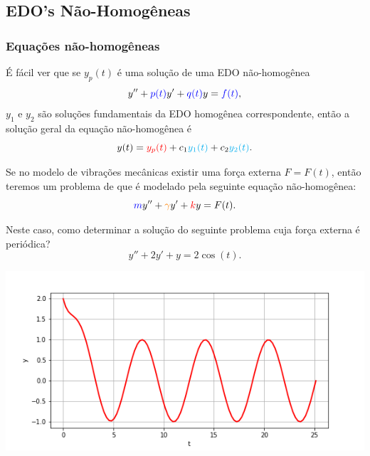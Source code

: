 %

\subsection*{EDO's Não-Homogêneas}



\begin{frame}
\frametitle{Equações não-homogêneas }

É fácil ver que se {\color{red}$y_p(t)$} é uma solução de uma EDO não-homogênea
\[y''+{\color{blue}p(t)}y'+{\color{blue}q(t)}y={\color{blue}f(t)},\]
 {\color{cyan}$y_1$} e {\color{cyan}$y_2$} são soluções fundamentais da EDO homogênea correspondente, então a solução geral da equação não-homogênea é
\[y(t)={\color{red}y_p(t)}+c_1{\color{cyan}y_1(t)}+c_2{\color{cyan}y_2(t)}.\]



\end{frame}

\begin{frame}
\begin{exe}
Se no modelo de vibrações mecânicas existir uma força externa $F=F(t)$, então teremos um problema de  que é modelado pela  seguinte equação não-homogênea:
\[{\color{blue}m}y''+{\color{orange}\gamma} y'+{\color{red}k}y =F(t).\]

Neste caso, como determinar a solução do  seguinte problema  cuja força externa é periódica?
\[y''+2y'+y=2\cos(t).\]
\end{exe}
\end{frame}

\begin{frame}
\begin{center}
\includegraphics[scale=0.5]{osc-for-ex1.png}
\end{center}
\end{frame}




